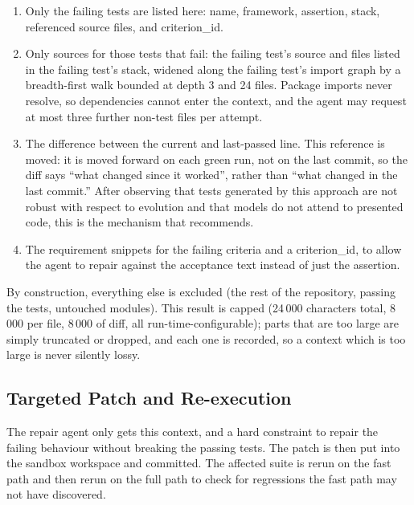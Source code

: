 \documentclass[pdflatex,sn-mathphys-num]{sn-jnl}%
\theoremstyle{thmstyleone}%
\theoremstyle{thmstyletwo}%
\theoremstyle{thmstylethree}%
\begin{document}
\begin{enumerate}
\item Only the failing tests are listed here: name, framework, assertion, stack, referenced source files, and criterion\_id.
\item Only sources for those tests that fail: the failing test's source and files listed in the failing test's stack, widened along the failing test's import graph by a breadth-first walk bounded at depth 3 and 24 files. Package imports never resolve, so dependencies cannot enter the context, and the agent may request at most three further non-test files per attempt.
\item The difference between the current and last-passed line. This reference is moved: it is moved forward on each green run, not on the last commit, so the diff says ``what changed since it worked'', rather than ``what changed in the last commit.'' After observing that tests generated by this approach are not robust with respect to evolution and that models do not attend to presented code, this is the mechanism that \cite{r11haroon} recommends.
\item The requirement snippets for the failing criteria and a criterion\_id, to allow the agent to repair against the acceptance text instead of just the assertion.
\end{enumerate}

By construction, everything else is excluded (the rest of the repository, passing the tests, untouched modules). This result is capped (24\,000 characters total, 8\,000 per file, 8\,000 of diff, all run-time-configurable); parts that are too large are simply truncated or dropped, and each one is recorded, so a context which is too large is never silently lossy.%

\subsection{Targeted Patch and Re-execution}\label{sec5.2}

The repair agent only gets this context, and a hard constraint to repair the failing behaviour without breaking the passing tests. The patch is then put into the sandbox workspace and committed. The affected suite is rerun on the fast path and then rerun on the full path to check for regressions the fast path may not have discovered.
\end{document}
